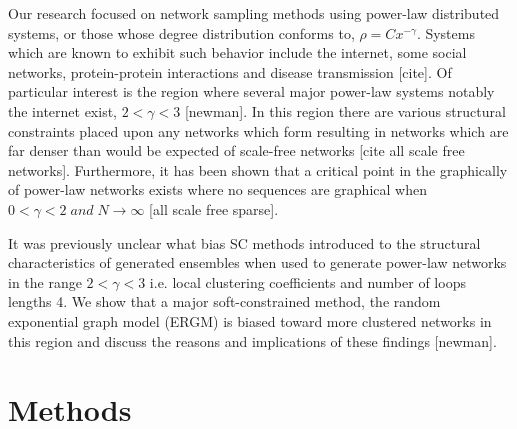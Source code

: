 \documentclass[aip,graphicx,amsmath]{revtex4-1}
\begin{document}
	Our research focused on network sampling methods using power-law distributed systems, or those whose degree distribution conforms to, $\rho=Cx^{-\gamma}$. Systems which are known to exhibit such behavior include the internet, some social networks, protein-protein interactions and disease transmission [cite]. Of particular interest is the region where several major power-law systems notably the internet exist, $2<\gamma<3$ [newman]. In this region there are various structural constraints placed upon any networks which form resulting in networks which are far denser than would be expected of scale-free networks [cite all scale free networks]. Furthermore, it has been shown that a critical point in the graphically of power-law networks exists where no sequences are graphical when $0<\gamma<2\; and\; N\to\infty$ [all scale free sparse].

	It was previously unclear what bias SC methods introduced to the structural characteristics of generated ensembles when used to generate power-law networks in the range $2<\gamma<3$ i.e. local clustering coefficients and number of loops lengths 4. We show that a major soft-constrained method, the random exponential graph model (ERGM) is biased toward more clustered networks in this region and discuss the reasons and implications of these findings [newman].
		
\section{Methods}
	
\end{document}
